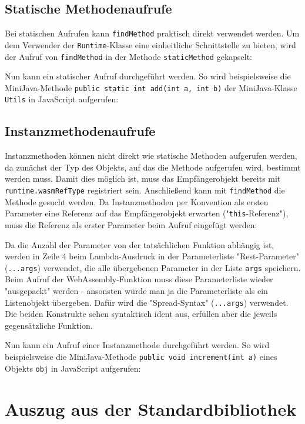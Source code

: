 \subsection{Statische Methodenaufrufe}

Bei statischen Aufrufen kann \lstinline{findMethod} praktisch direkt verwendet werden. Um dem Verwender der \lstinline{Runtime}-Klasse eine einheitliche Schnittstelle zu bieten, wird der Aufruf von \lstinline{findMethod} in der Methode \lstinline{staticMethod} gekapselt:



Nun kann ein statischer Aufruf durchgeführt werden. So wird beispielsweise die Mini\-Java-Methode \lstinline{public static int add(int a, int b)} der MiniJava-Klasse \lstinline{Utils} in Java\-Script aufgerufen:



\subsection{Instanzmethodenaufrufe}

Instanzmethoden können nicht direkt wie statische Methoden aufgerufen werden, da zunächst der Typ des Objekts, auf das die Methode aufgerufen wird, bestimmt werden muss. Damit dies möglich ist, muss das Empfängerobjekt bereits mit \lstinline{runtime.wasmRefType} registriert sein. Anschließend kann mit \lstinline{findMethod} die Methode gesucht werden. Da Instanzmethoden per Konvention als ersten Parameter eine Referenz auf das Empfängerobjekt erwarten ("\lstinline{this}-Referenz"), muss die Referenz als erster Parameter beim Aufruf eingefügt werden:



Da die Anzahl der Parameter von der tatsächlichen Funktion abhängig ist, werden in Zeile 4 beim Lambda-Ausdruck in der Parameterliste "Rest-Parameter" (\lstinline{...args}) \cite{MDNJavaScript} verwendet, die alle übergebenen Parameter in der Liste \lstinline{args} speichern. Beim Aufruf der WebAssembly-Funktion muss diese Parameterliste wieder "ausgepackt" werden - ansonsten würde man ja die Parameterliste als ein Listenobjekt übergeben. Dafür wird die "Spread-Syntax" (\lstinline{...args}) verwendet. Die beiden Konstrukte sehen syntaktisch ident aus, erfüllen aber die jeweils gegensätzliche Funktion.

Nun kann ein Aufruf einer Instanzmethode durchgeführt werden. So wird beispielsweise die MiniJava-Methode \lstinline{public void increment(int a)} eines Objekts \lstinline{obj} in JavaScript aufgerufen:



\section{Auszug aus der Standardbibliothek}
